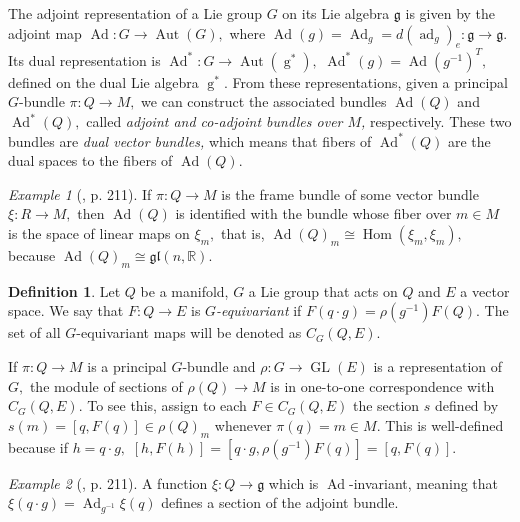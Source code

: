 \documentclass[12pt, letterpaper, reqno]{amsart}
\theoremstyle{definition}
\newtheorem{df}{Definition}
\theoremstyle{plain}
\theoremstyle{remark}
\newtheorem{ex}{Example}
\begin{document}
The adjoint representation of a Lie group $ G $ on its Lie algebra $ \mathfrak{g} $ is given by the adjoint map $ \operatorname{Ad} : G \rightarrow \operatorname{Aut}(G),  $ where $ \operatorname{Ad} (g)= \operatorname{Ad}_g= d( \operatorname{ad}_g )_e : \mathfrak{g}\rightarrow \mathfrak{g}. $ Its dual representation is $ \operatorname{Ad}^*: G \rightarrow \operatorname{Aut} ( \operatorname{g}^* ), $ $ \operatorname{Ad}^*(g)= \operatorname{Ad} (g^{-1})^T, $ defined on the dual Lie algebra $ \operatorname{g}^*. $ From these representations, given a principal $ G $-bundle $ \pi: Q \rightarrow M, $ we can construct the associated bundles $ \operatorname{Ad}(Q) $ and $ \operatorname{Ad}^*(Q), $ called \textit{adjoint and co-adjoint bundles over $ M $, } respectively. These two bundles are \textit{dual vector bundles,} which means that fibers of $  \operatorname{Ad}^*(Q)$ are the dual spaces to the fibers of $ \operatorname{Ad} (Q). $ 

\begin{ex}[\cite{montgomery2002tour}, p. 211]
	If $ \pi:Q \rightarrow M $ is the frame bundle of some vector bundle $ \xi: R \rightarrow M, $ then $ \operatorname{Ad}(Q) $ is identified with the bundle whose fiber over $ m\in M $ is the space of linear maps on $ \xi_m, $ that is, $ \operatorname{Ad} (Q)_m \cong \operatorname{Hom}(\xi_m,\xi_m),  $ because $ \operatorname{Ad}(Q)_m\cong \mathfrak{gl}(n, \mathbb{R}).  $ 
\end{ex}
\begin{df}\label{df:equivariant}
	Let $ Q $ be a manifold, $ G $ a Lie group that acts on $ Q $ and $ E $ a vector space. We say that $ F: Q \rightarrow E $ is \textit{$G$-equivariant} if $ F(q\cdot g) = \rho(g^{-1})F(Q). $ The set of all $ G $-equivariant maps will be denoted as $ C_G(Q,E). $  
\end{df}
If $ \pi: Q \rightarrow M $ is a principal $ G $-bundle and $ \rho: G \rightarrow \operatorname{GL} (E) $ is a representation  of $ G, $ the module of sections of $ \rho(Q) \rightarrow M $ is in one-to-one correspondence with $ C_G(Q,E). $ To see this, assign to each $ F\in C_G(Q,E) $ the section $s $ defined by $s(m)=[q, F(q)]\in \rho(Q)_m $ whenever $ \pi(q)=m\in M. $  This is well-defined because if $ h= q\cdot g, $ $ [h,F(h)]=[q\cdot g, \rho(g^{-1})F(q)]=[q,F(q)]$.  

\begin{ex}[\cite{montgomery2002tour}, p. 211]
	A function $ \xi: Q \rightarrow \mathfrak{g}  $ which is $ \operatorname{Ad}  $-invariant, meaning that $ \xi(q\cdot g)= \operatorname{Ad}_{g^{-1}}\xi(q) $ defines a section of the adjoint bundle. 
\end{ex}
\end{document}
